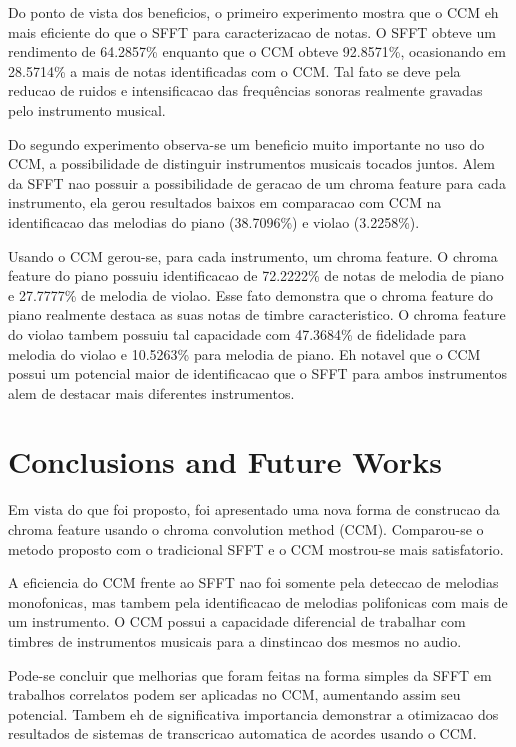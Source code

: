 \documentclass{article}
\begin{document}
	Do ponto de vista dos beneficios, o primeiro experimento mostra que o CCM eh mais eficiente do que o SFFT para caracterizacao de notas. O SFFT obteve um rendimento de 64.2857\% enquanto que o CCM obteve 92.8571\%, ocasionando em 28.5714\% a mais de notas identificadas com o CCM. Tal fato se deve pela reducao de ruidos e intensificacao das frequências sonoras realmente gravadas pelo instrumento musical. 

	Do segundo experimento observa-se um beneficio muito importante no uso do CCM, a possibilidade de distinguir instrumentos musicais tocados juntos. Alem da SFFT nao possuir a possibilidade de geracao de um chroma feature para cada instrumento, ela gerou resultados baixos em comparacao com CCM na identificacao das melodias do piano (38.7096\%) e violao (3.2258\%).

	Usando o CCM gerou-se, para cada instrumento, um chroma feature. O chroma feature do piano possuiu identificacao de 72.2222\% de notas de melodia de piano e 27.7777\% de melodia de violao. Esse fato demonstra que o chroma feature do piano realmente destaca as suas notas de timbre caracteristico. O chroma feature do violao tambem possuiu tal capacidade com 47.3684\% de fidelidade para melodia do violao e 10.5263\% para melodia de piano. Eh notavel que o CCM possui um potencial maior de identificacao que o SFFT para ambos instrumentos alem de destacar mais diferentes instrumentos.


	\section{Conclusions and Future Works}\label{sec:conclusions}

	Em vista do que foi proposto, foi apresentado uma nova forma de construcao da chroma feature usando o chroma convolution method (CCM). Comparou-se o metodo proposto com o tradicional SFFT e o CCM mostrou-se mais satisfatorio. 

	A eficiencia do CCM frente ao SFFT nao foi somente pela deteccao de melodias monofonicas, mas tambem pela identificacao de melodias polifonicas com mais de um instrumento. O CCM possui a capacidade diferencial de trabalhar com timbres de instrumentos musicais para a dinstincao dos mesmos no audio.

	 Pode-se concluir que melhorias que foram feitas na forma simples da SFFT em trabalhos correlatos podem ser aplicadas no CCM, aumentando assim seu potencial. Tambem eh de significativa importancia demonstrar a otimizacao dos resultados de sistemas de transcricao automatica de acordes usando o CCM.
\end{document}
